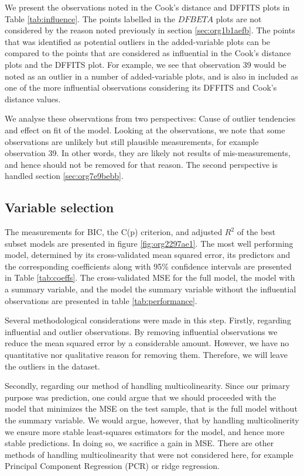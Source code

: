 \documentclass[11pt]{article}
\begin{document}
We present the observations noted in the Cook's distance and DFFITS plots in Table \ref{tab:influence}.
The points labelled in the \(DFBETA\) plots are not considered by the reason noted previously 
in section \ref{sec:org1b1aefb}. The points that was identified as potential outliers in the added-variable
plots can be compared to the points that are considered as influential in the Cook's distance plots
and the DFFITS plot. For example, we see that observation 39 would be noted as an outlier in a number of 
added-variable plots, and is also in included as one of the more influential observations considering 
its DFFITS and Cook's distance values.

We analyse these observations from two perspectives: Cause of outlier tendencies and effect on fit of 
the model. Looking at the observations, we note that some observations are unlikely but 
still plausible measurements, for example observation 39. In other words, they are likely not results
of mis-measurements, and hence should not be removed for that reason. The second perspective is handled 
section \ref{sec:org7e9bebb}.



\subsection{Variable selection}
\label{sec:org1be0e81}

The measurements for BIC, the C(p) criterion, and adjusted \(R^2\) of the best subset models are presented
in figure \ref{fig:org2297ae1}. The most well performing model, determined by its cross-validated 
mean squared error, its predictors and the corresponding coefficients along with 95\% confidence intervals are 
presented in Table \ref{tab:coeffs}. The cross-validated MSE for the full model, the model with a summary variable, 
and the model the summary variable without the influential observations are presented in table
\ref{tab:performance}. 

Several methodological considerations were made in this step. Firstly, regarding influential and outlier 
observations. By removing influential observations we reduce the mean squared error by a considerable amount.
However, we have no quantitative nor qualitative reason for removing them. Therefore, we will leave the 
outliers in the dataset. 

Secondly, regarding our method of handling multicolinearity. Since our primary purpose was prediction, 
one could argue that we should proceeded with the model that minimizes the MSE on the test sample, that is
the full model without the summary variable. We would argue, however, that by handling multicolinerity we 
ensure more stable least-squares estimators for the model, and hence more stable predictions. In doing so,
we sacrifice a gain in MSE. There are other methods of handling multicolinearity that were not considered
here, for example Principal Component Regression (PCR) or ridge regression.
\end{document}
